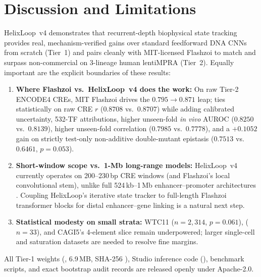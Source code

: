 \documentclass[10.5pt,a4paper]{article}
\begin{document}
\section{Discussion and Limitations}

HelixLoop~v4 demonstrates that recurrent-depth biophysical state tracking provides real, mechanism-verified gains over standard feedforward DNA CNNs from scratch (Tier~1) and pairs cleanly with MIT-licensed Flashzoi to match and surpass non-commercial  on 3-lineage human lentiMPRA (Tier~2). Equally important are the explicit boundaries of these results:
\begin{enumerate}
\item \textbf{Where Flashzoi vs.\ HelixLoop~v4 does the work:} On raw Tier-2 ENCODE4 CREs, MIT Flashzoi drives the $0.795\to 0.871$ leap;  ties  statistically on raw CRE $r$ ($0.8708$ vs.\ $0.8707$) while adding calibrated uncertainty, 532-TF attributions, higher unseen-fold \emph{in vivo} AUROC ($0.8250$ vs.\ $0.8139$), higher unseen-fold  correlation ($0.7985$ vs.\ $0.7778$), and a $+0.1052$ gain on strictly test-only non-additive double-mutant epistasis ($0.7513$ vs.\ $0.6461$, $p=0.053$).
\item \textbf{Short-window scope vs.\ 1-Mb long-range models:} HelixLoop~v4 currently operates on 200--230\,bp CRE windows (and Flashzoi's local convolutional stem), unlike full 524\,kb--1\,Mb enhancer--promoter architectures \citep{linder2025,avsec2026,gayoso2026}. Coupling HelixLoop's iterative state tracker to full-length Flashzoi transformer blocks for distal enhancer--gene linking is a natural next step.
\item \textbf{Statistical modesty on small strata:} WTC11 ($n=2{,}314$, $p=0.061$),  ($n=33$), and CAGI5's 4-element  slice remain underpowered; larger single-cell and saturation datasets are needed to resolve fine margins.
\end{enumerate}

All Tier-1 weights (, 6.9\,MB, SHA-256 ), Studio inference code (), benchmark scripts, and exact bootstrap audit records are released openly under Apache-2.0.
\end{document}
